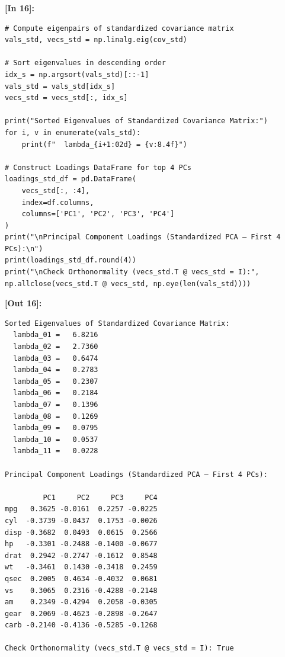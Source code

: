 \vspace{0.6em}
\noindent\textbf{\small [In 16]:}
\begin{lstlisting}[style=pycode]
# Compute eigenpairs of standardized covariance matrix
vals_std, vecs_std = np.linalg.eig(cov_std)

# Sort eigenvalues in descending order
idx_s = np.argsort(vals_std)[::-1]
vals_std = vals_std[idx_s]
vecs_std = vecs_std[:, idx_s]

print("Sorted Eigenvalues of Standardized Covariance Matrix:")
for i, v in enumerate(vals_std):
    print(f"  lambda_{i+1:02d} = {v:8.4f}")

# Construct Loadings DataFrame for top 4 PCs
loadings_std_df = pd.DataFrame(
    vecs_std[:, :4],
    index=df.columns,
    columns=['PC1', 'PC2', 'PC3', 'PC4']
)
print("\nPrincipal Component Loadings (Standardized PCA — First 4 PCs):\n")
print(loadings_std_df.round(4))
print("\nCheck Orthonormality (vecs_std.T @ vecs_std = I):", np.allclose(vecs_std.T @ vecs_std, np.eye(len(vals_std))))
\end{lstlisting}
\noindent\textbf{\small [Out 16]:}
\begin{lstlisting}[style=output]
Sorted Eigenvalues of Standardized Covariance Matrix:
  lambda_01 =   6.8216
  lambda_02 =   2.7360
  lambda_03 =   0.6474
  lambda_04 =   0.2783
  lambda_05 =   0.2307
  lambda_06 =   0.2184
  lambda_07 =   0.1396
  lambda_08 =   0.1269
  lambda_09 =   0.0795
  lambda_10 =   0.0537
  lambda_11 =   0.0228

Principal Component Loadings (Standardized PCA — First 4 PCs):

         PC1     PC2     PC3     PC4
mpg   0.3625 -0.0161  0.2257 -0.0225
cyl  -0.3739 -0.0437  0.1753 -0.0026
disp -0.3682  0.0493  0.0615  0.2566
hp   -0.3301 -0.2488 -0.1400 -0.0677
drat  0.2942 -0.2747 -0.1612  0.8548
wt   -0.3461  0.1430 -0.3418  0.2459
qsec  0.2005  0.4634 -0.4032  0.0681
vs    0.3065  0.2316 -0.4288 -0.2148
am    0.2349 -0.4294  0.2058 -0.0305
gear  0.2069 -0.4623 -0.2898 -0.2647
carb -0.2140 -0.4136 -0.5285 -0.1268

Check Orthonormality (vecs_std.T @ vecs_std = I): True
\end{lstlisting}

